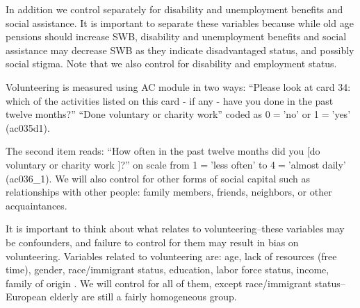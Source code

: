 \documentclass[10pt, letterpaper]{article}
\begin{document}
\begin{spacing}{1.4}
In addition we control separately for disability and unemployment benefits and social
assistance. It is important to separate these variables because while old age
pensions should increase SWB, disability and unemployment benefits and social
assistance may decrease SWB as they indicate disadvantaged status, and possibly
social stigma. Note that we also control for disability and employment status. 

Volunteering is measured using AC module in two ways: ``Please look at card 34: which of the activities listed on this card - if any - have you done in the past twelve
months?'' ``Done voluntary or charity work'' coded as 0$=$'no' or 
1$=$'yes'  (ac035d1). 

The second item reads: ``How often in the past twelve
months did you [do voluntary or charity work%
]?'' on scale from 1$=$'less often' to 4$=$'almost
daily' (ac036\_1). We will also control for other  forms of social capital such
as relationships with other people: family members, friends, neighbors, or other acquaintances. %
%
%
%

It is  important to think about what relates to
volunteering--these variables may be confounders, and failure to control for them may result in bias on
volunteering.  Variables related to volunteering are: age, lack of resources (free
time), gender, race/immigrant status, education, labor force status, income,
family of origin \citet{wilson12,haski09}. %
 We will control for all of them, except race/immigrant status--European elderly
 are still a fairly homogeneous group. 



\end{spacing}
\end{document}
